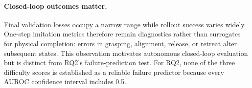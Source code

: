 \paragraph{Closed-loop outcomes matter.}
Final validation losses occupy a narrow range while rollout success varies
widely. One-step imitation metrics therefore remain diagnostics rather than
surrogates for physical completion: errors in grasping, alignment, release, or
retreat alter subsequent states. This observation motivates autonomous
closed-loop evaluation but is distinct from RQ2's failure-prediction test.
For RQ2, none of the three difficulty scores is established as a reliable
failure predictor because every AUROC confidence interval includes 0.5.
